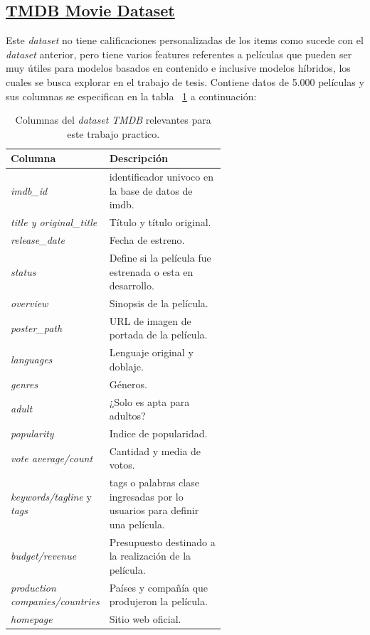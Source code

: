 \documentclass[11pt,a4paper,twoside]{thesis}
\begin{document}
\clearpage

\subsection{\href{https://www.kaggle.com/datasets/rounakbanik/the-movies-dataset?select=movies_metadata.csv}{TMDB Movie Dataset}}

Este \textit{dataset} no tiene calificaciones personalizadas de los items como sucede con el \textit{dataset} anterior, 
pero tiene varios features referentes a películas que pueden ser muy útiles para modelos basados en contenido e inclusive
modelos híbridos, los cuales se busca explorar en el trabajo de tesis. Contiene datos de 5.000 películas y sus columnas se especifican en la tabla ~\ref{table:tmdbColumns} a continuación:


\begin{table}[!htb]
	\centering
	\footnotesize
	\begin{tabular}{l | p{0.6\linewidth}}
	\hline
		Columna                      & Descripción \\
	\hline
	\textit{imdb\_id}                & identificador univoco en la base de datos de imdb. \\
	\textit{title y original\_title} & Título y título original. \\
	\textit{release\_date}           & Fecha de estreno. \\
	\textit{status}                  & Define si la película fue estrenada o esta en desarrollo. \\
	\textit{overview}                & Sinopsis de la película. \\
	\textit{poster\_path}            & URL de imagen de portada de la película. \\ 
	\textit{languages}               & Lenguaje original y doblaje. \\
	\textit{genres}                  & Géneros. \\
	\textit{adult}                   & ¿Solo es apta para adultos? \\
	\textit{popularity}              & Indice de popularidad. \\
	\textit{vote average/count}      & Cantidad y media de votos. \\
	\textit{keywords/tagline} y \textit{tags} & tags o palabras clase ingresadas por lo usuarios para definir una película. \\
	\textit{budget/revenue}                   & Presupuesto destinado a la realización de la película. \\
	\textit{production companies/countries}   & Países y compañía que produjeron la película. \\ 
	\textit{homepage}                         & Sitio web oficial. \\

	\hline
	\end{tabular}
	\caption{
		Columnas del \textit{dataset} \textit{TMDB} relevantes para este trabajo practico.
	}
	\label{table:tmdbColumns}
\end{table}
\end{document}
